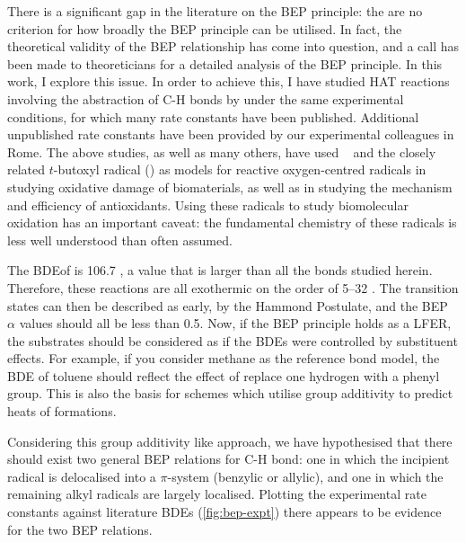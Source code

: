 There is a significant gap in the literature on the BEP principle: the are no criterion for how broadly the BEP principle can be utilised. In fact, the theoretical validity of the BEP relationship has come into question, and a call has been made to theoreticians for a detailed analysis of the BEP principle.\cite{vanSanten2010} In this work, I explore this issue. In order to achieve this, I have studied HAT reactions involving the abstraction of C-H bonds by \cumo under the same experimental conditions, for which many rate constants have been published.\cite{Bietti2010, Bietti2011, Pischel2001, Salamone2011, Salamone2012, Salamone2012a, Salamone2013, Salamone2015} Additional unpublished rate constants have been provided by our experimental colleagues in Rome. The above studies, as well as many others, have used \cumo~ and the closely related $t$-butoxyl radical () as models for reactive oxygen-centred radicals in studying oxidative damage of biomaterials,\cite{Adam1998, Adam2002, Jones2003} as well as in studying the mechanism and efficiency of antioxidants.\cite{MacFaul1996, Valgimigli1996, Valgimigli1999, Jovanovic1999, Sortino2003} Using these radicals to study biomolecular oxidation has an important caveat: the fundamental chemistry of these radicals is less well understood than often assumed. \cite{Tanko2001, Finn2004, Salamone2011b}

The BDE\footnotemark of  is 106.7 \kcalmol, a value that is larger than all the  bonds studied herein. Therefore, these reactions are all exothermic on the order of 5--32 \kcalmol. The transition states can then be described as early, by the Hammond Postulate, and the BEP $\alpha$ values should all be less than 0.5.\cite{Russell1973} Now, if the BEP principle holds as a LFER, the substrates should be considered as if the BDEs were controlled by substituent effects. For example, if you consider methane as the reference  bond model, the BDE of toluene should reflect the effect of replace one hydrogen with a phenyl group. This is also the basis for schemes which utilise group additivity to predict heats of formations.\cite{Benson1976}


Considering this group additivity like approach, we have hypothesised that there should exist two general BEP relations for C-H bond: one in which the incipient radical is delocalised into a $\pi$-system (benzylic or allylic), and one in which the remaining alkyl radicals are largely localised. Plotting the experimental rate constants against literature BDEs (\ref{fig:bep-expt}) there appears to be evidence for the two BEP relations.

